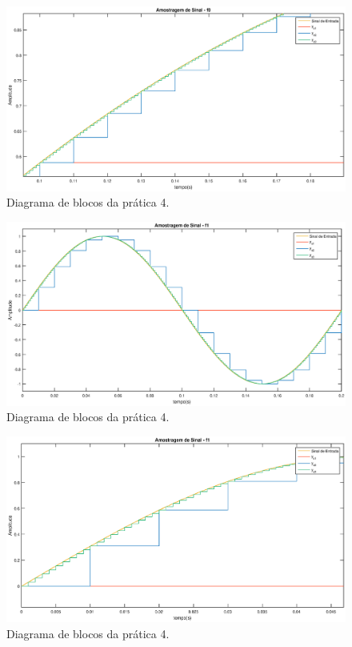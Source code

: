 \begin{figure}[!th]
	\centering
	\includegraphics[scale = .45]{Imagens/pratica4_3.eps}
	\caption{Diagrama de blocos da prática 4.}
	\label{fig:pr4_esquema}
	\end{figure}
	
	\begin{figure}[!th]
		\centering
		\includegraphics[scale = .45]{Imagens/pratica4_4.eps}
		\caption{Diagrama de blocos da prática 4.}
		\label{fig:pr4_esquema}
		\end{figure}
		
\begin{figure}[!th]
	\centering
	\includegraphics[scale = .45]{Imagens/pratica4_5.eps}
	\caption{Diagrama de blocos da prática 4.}
	\label{fig:pr4_esquema}
	\end{figure}
	
